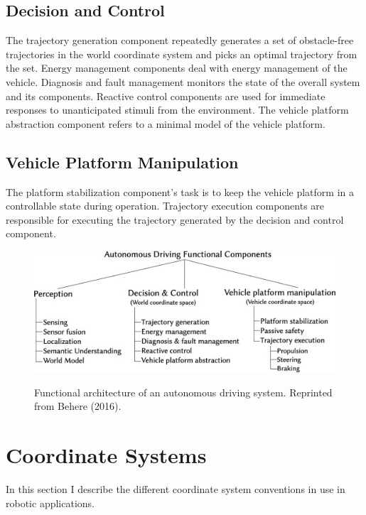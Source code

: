 \subsection{Decision and Control}
The trajectory generation component repeatedly generates a set of obstacle-free trajectories in the world coordinate system and picks an optimal trajectory from the set. Energy management components deal with energy management of the vehicle. Diagnosis and fault management monitors the state of the overall system and its components. Reactive control components are used for immediate responses to unanticipated stimuli from the environment. The vehicle platform abstraction component refers to a minimal model of the vehicle platform. 

\subsection{Vehicle Platform Manipulation}

The platform stabilization component's task is to keep the vehicle platform in a controllable state during operation. Trajectory execution components are responsible for executing the trajectory generated by the decision and control component. 

\begin{figure}
	\centering
	\caption[FAV of Antonomous Driving System.]{\small 
		Functional architecture of an autonomous driving system. Reprinted from Behere (2016). }
	\includegraphics[width=5in]{figures/literature/fav_autonomous_driving}
    \label{fig:fav_automonous}
\end{figure}

\section{Coordinate Systems}

In this section I describe the different coordinate system conventions in use in robotic applications. 
	

